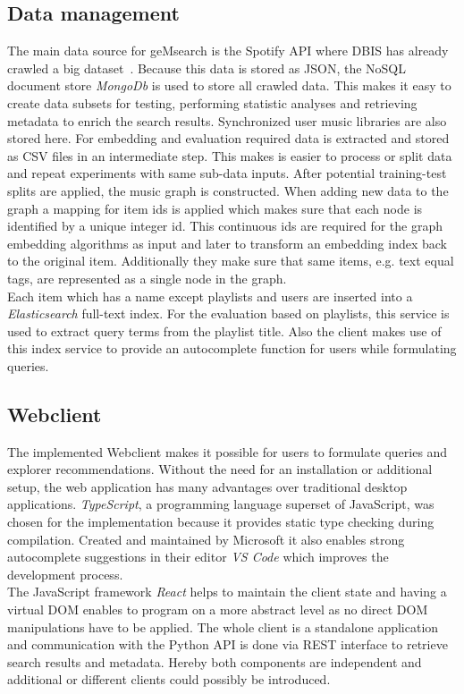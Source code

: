 \documentclass[sigconf]{acmart}
\begin{document}
\subsection{Data management}
The main data source for geMsearch is the Spotify API where DBIS has already crawled a big dataset~\cite{pichl2017improving}. Because this data is stored as JSON, the NoSQL document store \emph{MongoDb} is used to store all crawled data. This makes it easy to create data subsets for testing, performing statistic analyses and retrieving metadata to enrich the search results. Synchronized user music libraries are also stored here.
For embedding and evaluation required data is extracted and stored as CSV files in an intermediate step. This makes is easier to process or split data and repeat experiments with same sub-data inputs. After potential training-test splits are applied, the music graph is constructed. When adding new data to the graph a mapping for item ids is applied which makes sure that each node is identified by a unique integer id. This continuous ids are required for the graph embedding algorithms as input and later to transform an embedding index back to the original item. Additionally they make sure that same items, e.g. text equal tags, are represented as a single node in the graph. \\

Each item which has a name except playlists and users are inserted into a \emph{Elasticsearch} full-text index. For the evaluation based on playlists, this service is used to extract query terms from the playlist title. Also the client makes use of this index service to provide an autocomplete function for users while formulating queries.

\subsection{Webclient}

The implemented Webclient makes it possible for users to formulate queries and explorer recommendations. Without the need for an installation or additional setup, the web application has many advantages over traditional desktop applications. \emph{TypeScript}, a programming language superset of JavaScript, was chosen for the implementation because it provides static type checking during compilation. Created and maintained by Microsoft it also enables strong autocomplete suggestions in their editor \emph{VS Code} which improves the development process. \\
The JavaScript framework \emph{React} helps to maintain the client state and having a virtual DOM enables to program on a more abstract level as no direct DOM manipulations have to be applied. The whole client is a standalone application and communication with the Python API is done via REST interface to retrieve search results and metadata. Hereby both components are independent and additional or different clients could possibly be introduced. \\
\end{document}
